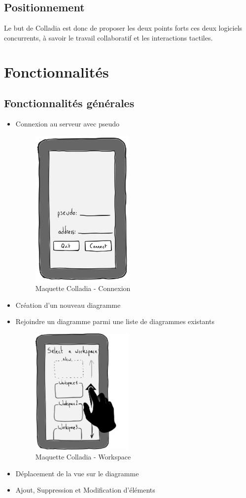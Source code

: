 \documentclass[a4paper,11pt]{article}
\begin{document}
\subsection{Positionnement}

Le but de Colladia est donc de proposer les deux points forts ces deux logiciels concurrents, à savoir le travail collaboratif et les interactions tactiles.


\section{Fonctionnalités}
\subsection{Fonctionnalités générales}
	\begin{itemize}
		\item Connexion au serveur avec pseudo
		\begin{figure}[h]
			\centering
			\includegraphics[width=5cm]{img/accueil.PNG}
			\caption{Maquette Colladia - Connexion}
		\end{figure}
		
		\item Création d'un nouveau diagramme
		\item Rejoindre un diagramme parmi une liste de diagrammes existants
		\begin{figure}[h]
			\centering
			\includegraphics[width=5cm]{img/workspace-selection.PNG}
			\caption{Maquette Colladia - Workspace}
		\end{figure}
		
		\item Déplacement de la vue sur le diagramme
		\item Ajout, Suppression et Modification d'éléments
	\end{itemize}
\end{document}
